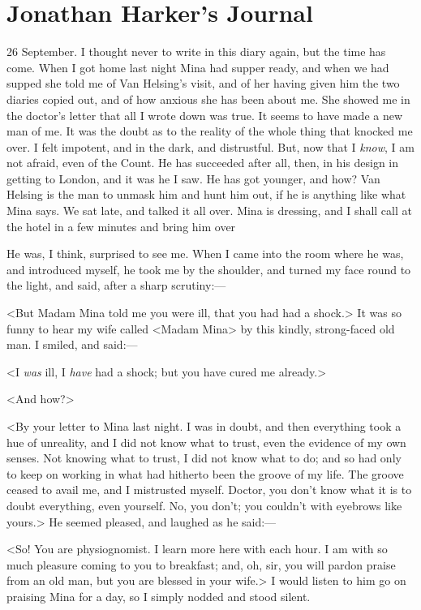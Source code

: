 \section{Jonathan Harker's Journal}

\begin{diary}{26 September.}
I thought never to write in this diary again, but the time has come. When I got home last night Mina had supper ready, and when we had supped she told me of Van Helsing's visit, and of her having given him the two diaries copied out, and of how anxious she has been about me. She showed me in the doctor's letter that all I wrote down was true. It seems to have made a new man of me. It was the doubt as to the reality of the whole thing that knocked me over. I felt impotent, and in the dark, and distrustful. But, now that I \textit{know}, I am not afraid, even of the Count. He has succeeded after all, then, in his design in getting to London, and it was he I saw. He has got younger, and how? Van Helsing is the man to unmask him and hunt him out, if he is anything like what Mina says. We sat late, and talked it all over. Mina is dressing, and I shall call at the hotel in a few minutes and bring him over

He was, I think, surprised to see me. When I came into the room where he was, and introduced myself, he took me by the shoulder, and turned my face round to the light, and said, after a sharp scrutiny:—

<But Madam Mina told me you were ill, that you had had a shock.> It was so funny to hear my wife called <Madam Mina> by this kindly, strong-faced old man. I smiled, and said:—

<I \textit{was} ill, I \textit{have} had a shock; but you have cured me already.>

<And how?>

<By your letter to Mina last night. I was in doubt, and then everything took a hue of unreality, and I did not know what to trust, even the evidence of my own senses. Not knowing what to trust, I did not know what to do; and so had only to keep on working in what had hitherto been the groove of my life. The groove ceased to avail me, and I mistrusted myself. Doctor, you don't know what it is to doubt everything, even yourself. No, you don't; you couldn't with eyebrows like yours.> He seemed pleased, and laughed as he said:—

<So! You are physiognomist. I learn more here with each hour. I am with so much pleasure coming to you to breakfast; and, oh, sir, you will pardon praise from an old man, but you are blessed in your wife.> I would listen to him go on praising Mina for a day, so I simply nodded and stood silent.


\end{diary}
